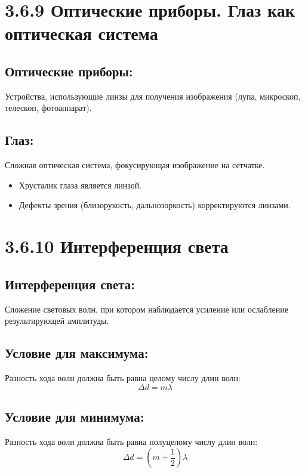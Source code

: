 \documentclass[a4paper,12pt]{article}
\begin{document}
\section*{3.6.9 Оптические приборы. Глаз как оптическая система}
\vspace{-9pt}
\subsection*{Оптические приборы:}
\vspace{-3pt}
Устройства, использующие линзы для получения изображения (лупа, микроскоп, телескоп, фотоаппарат).

\vspace{-9pt}
\subsection*{Глаз:}
\vspace{-3pt}
Сложная оптическая система, фокусирующая изображение на сетчатке.
\begin{itemize}
    \item Хрусталик глаза является линзой.
    \item Дефекты зрения (близорукость, дальнозоркость) корректируются линзами.
\end{itemize}

\newpage
\section*{3.6.10 Интерференция света}
\vspace{-9pt}
\subsection*{Интерференция света:}
\vspace{-3pt}
Сложение световых волн, при котором наблюдается усиление или ослабление результирующей амплитуды.

\vspace{-9pt}
\subsection*{Условие для максимума:}
\vspace{-3pt}
Разность хода волн должна быть равна целому числу длин волн:
\vspace{-0.05em}
$$ \Delta d = m\lambda $$

\vspace{-9pt}
\subsection*{Условие для минимума:}
\vspace{-3pt}
Разность хода волн должна быть равна полуцелому числу длин волн:
\vspace{-0.05em}
$$ \Delta d = \left(m + \frac{1}{2}\right)\lambda $$
\end{document}
